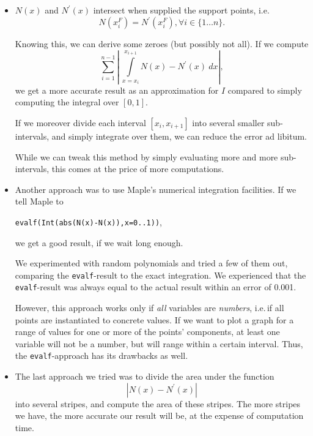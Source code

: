 \documentclass{article}
\begin{document}
\begin{itemize}
\item $N\left(x\right)$ and $N^\prime\left(x\right)$ intersect when supplied the support points, i.e.\,
  \begin{equation*}
    N\left(x_i^F\right) = N^\prime\left(x_i^F\right), \forall i \in \{1 \dots n\}.
  \end{equation*}

  Knowing this, we can derive some zeroes (but possibly not all). If we compute
  \begin{equation*}
    \sum\limits_{i=1}^{n-1} \left|\ \int\limits_{x=x_i}^{x_{i+1}} N\left(x\right) - N^\prime\left(x\right)\ dx \right|,
  \end{equation*}
  we get a more accurate result as an approximation for $I$ compared to simply computing the integral over $[0,1]$. 

  If we moreover divide each interval $[x_i,x_{i+1}]$ into several smaller sub-intervals, and simply integrate over them, we can reduce the error ad libitum.

  While we can tweak this method by simply evaluating more and more sub-intervals, this comes at the price of more computations.
\item Another approach was to use Maple's numerical integration facilities. If we tell Maple to
  \begin{center}
    \texttt{evalf(Int(abs(N(x)-N(x)),x=0..1))},
  \end{center}
  we get a good result, if we wait long enough.

  We experimented with random polynomials and tried a few of them out, comparing the \texttt{evalf}-result to the exact integration. We experienced that the \texttt{evalf}-result was always equal to the actual result within an error of 0.001.

  However, this approach works only if \emph{all} variables are \emph{numbers}, i.e.\,if all points are instantiated to concrete values. If we want to plot a graph for a range of values for one or more of the points' components, at least one variable will not be a number, but will range within a certain interval. Thus, the \texttt{evalf}-approach has its drawbacks as well.
\item The last approach we tried was to divide the area under the function 
  \begin{equation*}
    \left| N\left(x\right)-N^\prime\left(x\right) \right|
  \end{equation*}
  into several stripes, and compute the area of these stripes. The more stripes we have, the more accurate our result will be, at the expense of computation time.
\end{itemize}
\end{document}
